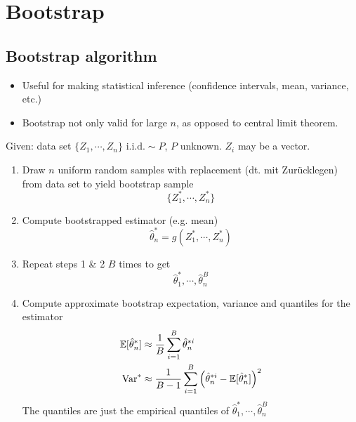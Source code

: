 \section{Bootstrap}
\subsection{Bootstrap algorithm}
\label{subsec:bootstrap_algorithm}
\begin{application}
\begin{itemize}
 \item Useful for making statistical inference (confidence intervals, mean, variance, etc.)
 \item[\leftthumbsup] Bootstrap not only valid for large $n$, as opposed to central limit theorem.
\end{itemize}
\end{application}
\begin{theory}
 Given: data set $\{Z_1, \cdots, Z_n\} \text{ i.i.d.} \sim P$, $P$ unknown. $Z_i$ may be a vector.
 \begin{enumerate}
  \item Draw $n$ uniform random samples with replacement (dt. mit Zur{\"u}cklegen) from data set to yield bootstrap sample
        \begin{equation*}
         \{Z_1^*, \cdots, Z_n^*\}
        \end{equation*} 
  \item Compute bootstrapped estimator (e.g. mean)
        \begin{equation*}
         \hat{\theta}_n^{\ast} = g(Z_1^*, \cdots, Z_n^{\ast})
        \end{equation*}
  \item Repeat steps 1 \& 2 $B$ times to get
        \begin{equation*}
         \hat{\theta}_1^{\ast}, \cdots, \hat{\theta}_n^B
        \end{equation*}
  \item Compute approximate bootstrap expectation, variance and quantiles for the estimator
        \begin{align*}
        \mathbb{E}[\hat{\theta}^{\ast}_n] & \approx \frac{1}{B} \sum_{i=1}^B \hat{\theta}_n^{\ast i}\\
        \operatorname{Var}^{\ast}                       & \approx \frac{1}{B-1} \sum_{i=1}^B \left( \hat{\theta}_n^{\ast i} - \mathbb{E}[\hat{\theta}^{\ast}_n] \right)^2
        \end{align*}  
        The quantiles are just the empirical quantiles of $\hat{\theta}_1^{\ast}, \cdots, \hat{\theta}_n^B$
 \end{enumerate}
\end{theory}
